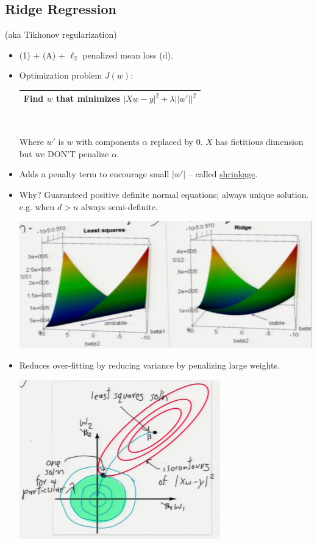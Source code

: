 \documentclass[10pt]{article}
\begin{document}
	\subsection*{Ridge Regression} (aka Tikhonov regularization)
	\
	\begin{itemize}
		\item (1) + (A) + $\ell_{2}$ penalized mean loss (d).
		\item Optimization problem $J(w)$:
		\begin{center}
			\begin{tabular}{|c|}
				\hline
				Find $w$ that minimizes
				$|Xw - y|^{2} + \lambda||w'||^{2}$\\
				\hline
			\end{tabular}\\
		\end{center}
		Where $w'$ is $w$ with components $\alpha$ replaced by 0. $X$ has fictitious dimension but we DON'T penalize $\alpha$.
		\item Adds a penalty term to encourage small $|w'|$ -- called \underline{shrinkage}.
		\item Why? Guaranteed positive definite normal equations; always unique solution. e.g. when $d>n$ always semi-definite.
			\begin{center}
				\includegraphics[scale=0.5]{images/ridge}
			\end{center}
		\item Reduces over-fitting by reducing variance by penalizing large weights.
			\begin{center}
				\includegraphics[scale=0.5]{images/sqrsvslambda}

\end{center}
\end{itemize}
\end{document}
